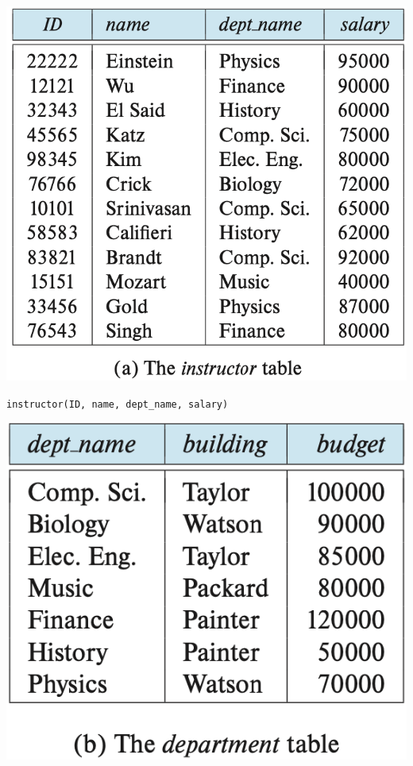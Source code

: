 \documentclass[aspectratio=169, 14pt]{beamer}
\begin{document}
\begin{frame}
    \begin{center}
        \includegraphics[height=.7\paperheight]{table/instructor}

        \texttt{instructor(ID, name, dept\_name, salary)}
    \end{center}
\end{frame}
\begin{frame}

    \begin{center}
        \includegraphics[height=.7\paperheight]{table/department}
    \end{center}
\end{frame}
\end{document}

